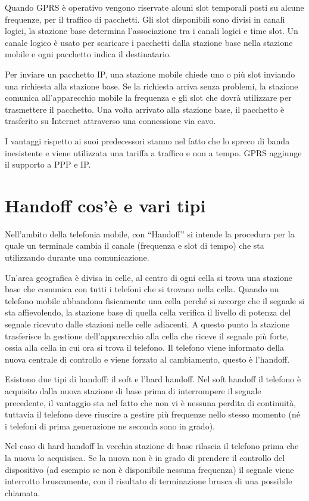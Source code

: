 Quando GPRS è operativo vengono riservate alcuni slot temporali posti su alcune frequenze, per il traffico di pacchetti.
Gli slot disponibili sono divisi in canali logici, la stazione base determina l’associazione tra i canali logici e time slot. Un canale logico è usato per scaricare i pacchetti dalla stazione base nella stazione mobile e ogni pacchetto indica il destinatario.

Per inviare un pacchetto IP, una stazione mobile chiede uno o più slot inviando una richiesta alla stazione base. Se la richiesta arriva senza problemi, la stazione comunica all’apparecchio mobile la frequenza e gli slot che dovrà utilizzare per trasmettere il pacchetto. Una volta arrivato alla stazione base, il pacchetto è trasferito su Internet attraverso una connessione via cavo.

I vantaggi rispetto ai suoi predecessori stanno nel fatto che lo spreco di banda inesistente e viene utilizzata una tariffa a traffico e non a tempo. GPRS aggiunge il supporto a PPP e IP.

\section{Handoff cos’è e vari tipi}

Nell’ambito della telefonia mobile, con “Handoff” si intende la procedura per la quale un terminale cambia il canale (frequenza e slot di tempo) che sta utilizzando durante una comunicazione.

Un’area geografica è divisa in celle, al centro di ogni cella si trova una stazione base che comunica con tutti i telefoni che si trovano nella cella.
Quando un telefono mobile abbandona fisicamente una cella perché si accorge che il segnale si sta affievolendo, la stazione base di quella cella verifica il livello di potenza del segnale ricevuto dalle stazioni nelle celle adiacenti. A questo punto la stazione trasferisce la gestione dell’apparecchio alla cella che riceve il segnale più forte, ossia alla cella in cui ora si trova il telefono.
Il telefono viene informato della nuova centrale di controllo e viene forzato al cambiamento, questo è l’handoff.

Esistono due tipi di handoff: il soft e l’hard handoff. Nel soft handoff il telefono è acquisito dalla nuova stazione di base prima di interrompere il segnale precedente, il vantaggio sta nel fatto che non vi è nessuna perdita di continuità, tuttavia il telefono deve riuscire a gestire più frequenze nello stesso momento (né i telefoni di prima generazione ne seconda sono in grado).

Nel caso di hard handoff la vecchia stazione di base rilascia il telefono prima che la nuova lo acquisisca. Se la nuova non è in grado di prendere il controllo del dispositivo (ad esempio se non è disponibile nessuna frequenza) il segnale viene interrotto bruscamente, con il risultato di terminazione brusca di una possibile chiamata.


